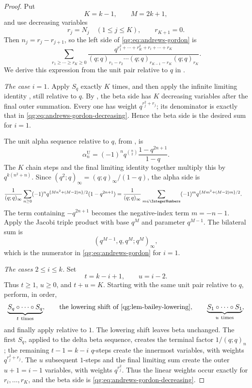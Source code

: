 \begin{proof}
Put
\[
  K=k-1,\qquad M=2k+1,
\]
and use decreasing variables
\[
  r_j=N_j\quad(1\le j\le K),\qquad r_{K+1}=0.
\]
Then \(n_j=r_j-r_{j+1}\), so the left side of
\eqref{qg:eq:andrews-gordon} is
\begin{equation}
 \sum_{r_1\ge\cdots\ge r_K\ge0}
 \frac{
 q^{r_1^2+\cdots+r_K^2+r_i+\cdots+r_K}}
 {(q;q)_{r_1-r_2}\cdots
  (q;q)_{r_{K-1}-r_K}(q;q)_{r_K}}.
 \label{qg:eq:andrews-gordon-decreasing}
\end{equation}
We derive this expression from the unit pair relative to \(q\) in
.

\smallskip
\noindent\emph{The case \(i=1\).}
Apply \(S_q\) exactly \(K\) times, and then apply the infinite limiting
identity , still relative to \(q\).
By , the beta side has \(K\)
decreasing variables after the final outer summation.  Every one has weight
\(q^{r_j^2+r_j}\); its denominator is exactly that in
\eqref{qg:eq:andrews-gordon-decreasing}.  Hence the beta side is the
desired sum for \(i=1\).

The unit alpha sequence relative to \(q\), from
, is
\[
 \alpha_n^{\mathrm U}
 =(-1)^nq^{\binom n2}\frac{1-q^{2n+1}}{1-q}.
\]
The \(K\) chain steps and the final limiting identity together multiply
this by \(q^{k(n^2+n)}\).  Since
\((q^2;q)_\infty=(q;q)_\infty/(1-q)\), the alpha side is
\begin{align*}
 \frac1{(q;q)_\infty}
 \sum_{n\ge0}(-1)^n
 q^{\{Mn^2+(M-2)n\}/2}(1-q^{2n+1})
 &=
 \frac1{(q;q)_\infty}
 \sum_{m\in\IntegerNumbers}(-1)^m
 q^{\{Mm^2+(M-2)m\}/2}.
\end{align*}
The term containing \(-q^{2n+1}\) becomes the negative-index term
\(m=-n-1\).  Apply the Jacobi triple product
 with base \(q^M\) and parameter \(q^{M-1}\).
The bilateral sum is
\[
  (q^{M-1},q,q^M;q^M)_\infty,
\]
which is the numerator in \eqref{qg:eq:andrews-gordon} for
\(i=1\).

\smallskip
\noindent\emph{The cases \(2\le i\le k\).}
Set
\[
  t=k-i+1,\qquad u=i-2.
\]
Thus \(t\ge1\), \(u\ge0\), and \(t+u=K\).  Starting with the same
unit pair relative to \(q\), perform, in order,
\[
  \underbrace{S_q\circ\cdots\circ S_q}_{t\ \mathrm{times}},
  \qquad
  \text{the lowering shift of
        \Cref{qg:lem-bailey-lowering}},
  \qquad
  \underbrace{S_1\circ\cdots\circ S_1}_{u\ \mathrm{times}},
\]
and finally apply  relative to \(1\).
The lowering shift leaves beta unchanged.  The first \(S_q\), applied to
the delta beta sequence, creates the terminal factor \(1/(q;q)_n\);
the remaining \(t-1=k-i\) \(q\)-steps create the innermost variables,
with weights \(q^{r_j^2+r_j}\).  The \(u\) subsequent \(1\)-steps and
the final limiting sum create the outer \(u+1=i-1\) variables, with
weights \(q^{r_j^2}\).  Thus the linear weights occur exactly for
\(r_i,\ldots,r_K\), and the beta side is
\eqref{qg:eq:andrews-gordon-decreasing}.


\end{proof}
